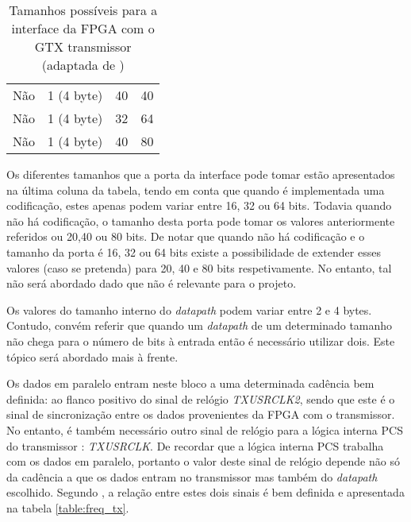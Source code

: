 \begin{table}[h!]
{\begin{tabular}{rlll}
			\multicolumn{1}{r|}{Não}                        & 1 (4 byte)                                       & 40                                           & 40                                                \\
			\multicolumn{1}{r|}{Não}                        & 1 (4 byte)                                       & 32                                           & 64                                                \\
			\multicolumn{1}{r|}{Não}                        & 1 (4 byte)                                       & 40                                           & 80                                                \\ \hline
		\end{tabular}%
	}
	\caption[Tamanhos possíveis para a interface da FPGA com o GTX transmissor]{Tamanhos possíveis para a interface da FPGA com o GTX transmissor (adaptada de \cite{R011})}
	\label{table:tx_interface}
\end{table}

Os diferentes tamanhos que a porta da interface pode tomar estão apresentados na última coluna da tabela, tendo em conta que quando é implementada uma codificação, estes apenas podem variar entre 16, 32 ou 64 bits. Todavia quando não há codificação, o tamanho desta porta pode tomar os valores anteriormente referidos ou 20,40 ou 80 bits. De notar que quando não há codificação e o tamanho da porta é 16, 32 ou 64 bits existe a possibilidade de extender esses valores (caso se pretenda) para 20, 40 e 80 bits respetivamente. No entanto, tal não será abordado dado que não é relevante para o projeto. 

Os valores do tamanho interno do \textit{datapath} podem variar entre 2 e 4 bytes. Contudo, convém referir que quando um \textit{datapath} de um determinado tamanho não chega para o número de bits à entrada então é necessário utilizar dois. Este tópico será abordado mais à frente.

Os dados em paralelo entram neste bloco a uma determinada cadência bem definida: ao flanco positivo do sinal de relógio \textit{TXUSRCLK2}, sendo que este é o sinal de sincronização entre os dados provenientes da FPGA com o transmissor. No entanto, é também necessário outro sinal de relógio para a lógica interna PCS do transmissor : \textit{TXUSRCLK}. De recordar que a lógica interna PCS trabalha com os dados em paralelo, portanto o valor deste sinal de relógio depende não só da cadência a que os dados entram no transmissor mas também do \textit{datapath} escolhido. Segundo \cite{R011}, a relação entre estes dois sinais é bem definida e apresentada na tabela \ref{table:freq_tx}.


